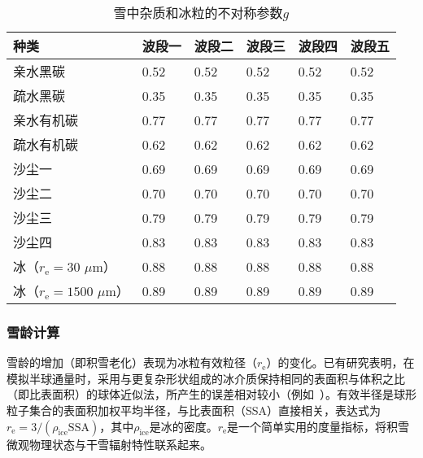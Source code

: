 \begin{table}[htbp]
  \centering
  \caption{雪中杂质和冰粒的不对称参数$g$}
  \label{tab:积雪不对称参数}
  \begin{tabular}{llllll}
    \toprule
    种类                                       & 波段一 & 波段二 & 波段三 & 波段四 & 波段五 \\ \midrule
    亲水黑碳                                   & 0.52   & 0.52   & 0.52   & 0.52   & 0.52   \\
    疏水黑碳                                   & 0.35   & 0.35   & 0.35   & 0.35   & 0.35   \\
    亲水有机碳                                 & 0.77   & 0.77   & 0.77   & 0.77   & 0.77   \\
    疏水有机碳                                 & 0.62   & 0.62   & 0.62   & 0.62   & 0.62   \\
    沙尘一                                     & 0.69   & 0.69   & 0.69   & 0.69   & 0.69   \\
    沙尘二                                     & 0.70   & 0.70   & 0.70   & 0.70   & 0.70   \\
    沙尘三                                     & 0.79   & 0.79   & 0.79   & 0.79   & 0.79   \\
    沙尘四                                     & 0.83   & 0.83   & 0.83   & 0.83   & 0.83   \\
    冰（$r_{\mathrm e}=30$ $\mu\mathrm{m}$）   & 0.88   & 0.88   & 0.88   & 0.88   & 0.88   \\
    冰（$r_{\mathrm e}=1500$ $\mu\mathrm{m}$） & 0.89   & 0.89   & 0.89   & 0.89   & 0.89   \\ \bottomrule
  \end{tabular}
\end{table}

\subsubsection{雪龄计算}\label{雪龄计算}

雪龄的增加（即积雪老化）表现为冰粒有效粒径（$r_{\mathrm e}$）的变化。已有研究表明，在模拟半球通量时，采用与更复杂形状组成的冰介质保持相同的表面积与体积之比（即比表面积）的球体近似法，所产生的误差相对较小（例如~\citet{grenfell1999RepresentationNonsphericalIce}）。有效半径是球形粒子集合的表面积加权平均半径，与比表面积（SSA）直接相关，表达式为$r_{\mathrm e}=3/(\rho_{\mathrm{ice}}\text{SSA})$，其中$\rho_{\mathrm{ice}}$是冰的密度。$r_{\mathrm e}$是一个简单实用的度量指标，将积雪微观物理状态与干雪辐射特性联系起来。

